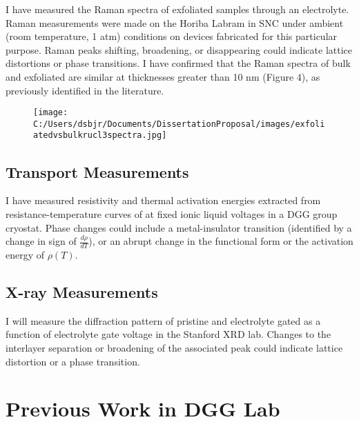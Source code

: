 \documentclass[11pt]{article}
\begin{document}
I have measured the Raman spectra of exfoliated \rucl samples through an electrolyte. Raman measurements were made on the Horiba Labram in SNC under ambient (room temperature, 1 atm) conditions on devices fabricated for this particular purpose. Raman peaks shifting, broadening, or disappearing could indicate lattice distortions or phase transitions. I have confirmed that the Raman spectra of bulk and exfoliated \rucl are similar at thicknesses greater than 10 nm (Figure 4), as previously identified in the literature.

\begin{figure}
\centering
	{\texttt{[image: C:/Users/dsbjr/Documents/DissertationProposal/images/exfoliatedvsbulkrucl3spectra.jpg]}}
  \captionsetup{width=0.5\textwidth}
  \label{fig:f1}
\end{figure}

\subsection{Transport Measurements}

I have measured resistivity and thermal activation energies extracted from resistance-temperature curves of \rucl at fixed ionic liquid voltages in a DGG group cryostat. Phase changes could include a metal-insulator transition (identified by a change in sign of $\frac{d\rho}{dT}$), or an abrupt change in the functional form or the activation energy of $\rho(T)$.

\subsection{X-ray Measurements}

I will measure the diffraction pattern of pristine and electrolyte gated \rucl as a function of electrolyte gate voltage in the Stanford XRD lab. Changes to the interlayer separation or broadening of the associated peak could indicate lattice distortion or a phase transition.

\section{Previous Work in DGG Lab}
\end{document}
